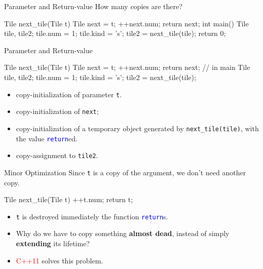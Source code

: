 \documentclass{beamer}
\newcommand{\red}[1]{\textcolor{red}{#1}}
\newcommand{\blue}[1]{\textcolor{blue}{#1}}
\newcommand{\ttt}[1]{\texttt{#1}}
\newcommand{\bluett}[1]{\blue{\ttt{#1}}}
\theoremstyle{definition}
\begin{document}
\begin{frame}[fragile]{Parameter and Return-value}
    How many copies are there?
    \begin{cpp}
Tile next_tile(Tile t) {
  Tile next = t;
  ++next.num;
  return next;
}
int main() {
  Tile tile, tile2;
  tile.num = 1;
  tile.kind = 's';
  tile2 = next_tile(tile);
  return 0;
}
    \end{cpp}
\end{frame}

\begin{frame}[fragile]{Parameter and Return-value}
    \begin{cpp}
Tile next_tile(Tile t) {
  Tile next = t;
  ++next.num;
  return next;
}
// in main
Tile tile, tile2;
tile.num = 1; tile.kind = 's';
tile2 = next_tile(tile);
    \end{cpp}
    \begin{itemize}
        \item copy-initialization of parameter \ttt{t}.
        \item copy-initialization of \ttt{next};
        \item copy-initialization of a temporary object generated by \ttt{next\_tile(tile)}, with the value \bluett{return}ed.
        \item copy-assignment to \ttt{tile2}.
    \end{itemize}
\end{frame}

\begin{frame}[fragile]{Minor Optimization}
    Since \ttt{t} is a copy of the argument, we don't need another copy.
    \begin{cpp}
Tile next_tile(Tile t) {
  ++t.num;
  return t;
}
    \end{cpp}
    \pause
    \begin{itemize}
        \item \ttt{t} is destroyed immediately the function \bluett{return}s.
        \pause
        \item Why do we have to copy something \textbf{almost dead}, instead of simply \textbf{extending} its lifetime?
        \pause
        \item \red{C++11} solves this problem.
    \end{itemize}
\end{frame}
\end{document}

